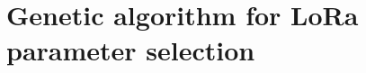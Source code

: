 \documentclass[conference]{../../setup/IEEEtran}
\begin{document}
\preface
\body

% 	

% 	
% 	
% 	
% 	
% 	
% 	

% 	
% 	
% 	
% 	
% 	
% 	
% 	
% 	

% 	
% 	
% 	
% 	
% 	
% 	
% 	
% 	

% 	
% 	
% 	
% 	
% 	
% 	
% 	
% 	

\chapter{Genetic algorithm for LoRa parameter selection}
	
	
	
	
	
	
\end{document}
